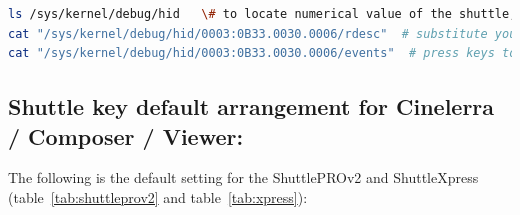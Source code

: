 \begin{lstlisting}[language=Bash,numbers=none]
ls /sys/kernel/debug/hid   \# to locate numerical value of the shuttle, e.g. 0003:0B33.0030.0006
cat "/sys/kernel/debug/hid/0003:0B33.0030.0006/rdesc"  # substitute your own numerical value
cat "/sys/kernel/debug/hid/0003:0B33.0030.0006/events"  # press keys to see the results
\end{lstlisting}

\subsection{Shuttle key default arrangement for Cinelerra / Composer / Viewer:}%
\label{sub:shuttle_key_default_cinelerra}

The following is the default setting for the ShuttlePROv2 and ShuttleXpress (table~\ref{tab:shuttleprov2} and table~\ref{tab:xpress}):

